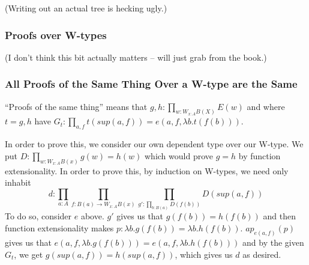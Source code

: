 \documentclass{article}
\renewcommand{\l}{\lambda}
\begin{document}
(Writing out an actual tree is hecking ugly.)

\subsubsection*{Proofs over W-types}

(I don't think this bit actually matters -- will just grab from the book.)

\subsubsection*{All Proofs of the Same Thing Over a W-type are the Same}

``Proofs of the same thing'' means that $g, h: \prod_{w: W_{x: A} B(X)} E(w)$
and where $t = g, h$ have $G_t: \prod_{a, f} t(sup(a, f)) = e(a, f, \l b. t(f(b)))$.

In order to prove this, we consider our own dependent type over our W-type. We put
$D: \prod_{w: W_{x: A} B(x)} g(w) = h(w)$ which would prove $g = h$ by function extensionality.
In order to prove this, by induction on W-types, we need only inhabit
\[
d: \prod_{a: A} \prod_{f: B(a) \to W_{x: A} B(x)} \prod_{g': \prod_{b: B(a)} D(f(b))} D(sup(a, f))
\]
To do so, consider $e$ above. $g'$ gives us that $g(f(b)) = h(f(b))$ and then function
extensionality makes $p: \l b. g(f(b)) = \l b. h(f(b))$. $ap_{e(a, f)}(p)$ gives us that
$e(a, f, \l b. g(f(b))) = e(a, f, \l b. h(f(b)))$ and by the given $G_t$, we get
$g(sup(a, f)) = h(sup(a, f))$, which gives us $d$ as desired.
\end{document}
